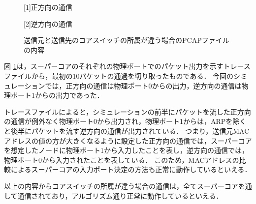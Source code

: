 \begin{figure}[tb]
	\begin{center}
		
		\begin{center}
			\hspace{1.6cm} [1]正方向の通信
		\end{center}
		
		\begin{center}
			\hspace{1.6cm} [2]逆方向の通信
		\end{center}
		\caption{送信元と送信先のコアスイッチの所属が違う場合のPCAPファイルの内容}
		\label{fig:4-3}
	\end{center}
\end{figure}

図 \ref{fig:4-3}は，スーパーコアのそれぞれの物理ポートでのパケット出力を示すトレースファイルから，最初の10パケットの通過を切り取ったものである．
今回のシミュレーションでは，正方向の通信は物理ポート0からの出力，逆方向の通信は物理ポート1からの出力であった．

トレースファイルによると，シミュレーションの前半にパケットを流した正方向の通信が例外なく物理ポート0から出力され，物理ポート1からは，ARPを除くと後半にパケットを流す逆方向の通信が出力されている．
つまり，送信元MACアドレスの値の方が大きくなるように設定した正方向の通信では，スーパーコアを想定したノードに物理ポート1から入力したことを表し，逆方向の通信では，物理ポート0から入力されたことを表している．
このため，MACアドレスの比較によるスーパーコアの入力ポート決定の方法も正常に動作しているといえる．

以上の内容からコアスイッチの所属が違う場合の通信は，全てスーパーコアを通して通信されており，アルゴリズム通り正常に動作しているといえる．

